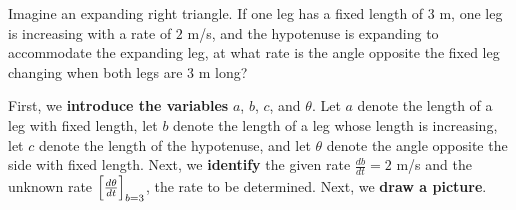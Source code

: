 \documentclass{ximera}
\begin{document}
\begin{example}
  Imagine an expanding right triangle. If one leg has a fixed length
  of $3$ m, one leg is increasing with a rate of $2$ m/s, and the
  hypotenuse is expanding to accommodate the expanding leg, at what
  rate is the angle opposite the fixed leg changing when both legs
  are $3$ m long?
  \begin{explanation}
  First, we \textbf{introduce the variables}  $a$, $b$, $c$, and $\theta$. Let $a$ denote the length of a leg with fixed length, let $b$ denote the length of a leg whose length is increasing, 
  let $c$ denote the length of the hypotenuse, and let $\theta$ denote the angle opposite the side with fixed length. Next, we \textbf{identify} the given rate $\frac{db}{dt}=2$ m/s and the unknown rate $\Bigl[\frac{d\theta}{dt}\Bigr]_{b=3}$, the rate to be determined.
    Next, we \textbf{draw a picture}.
    \begin{image}
    \end{image} 


\end{explanation}
\end{example}
\end{document}
